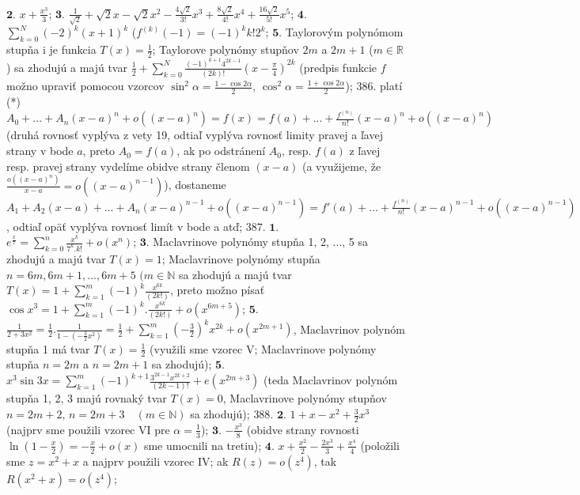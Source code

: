$\boldsymbol{2.}$ $x+\frac{x^{3}}{3}$;
$\boldsymbol{3.}$ $\frac{1}{\sqrt{2}}+\sqrt{2}x-\sqrt{2}x^{2}-\frac{4\sqrt{2}}{3!}x^{3}+\frac{8\sqrt{2}}{4!}x^{4}+\frac{16\sqrt{2}}{5!}x^{5}$;
$\boldsymbol{4.}$ $\sum_{k=0}^N (-2)^{k}(x+1)^{k}$ ($f^{(k)}(-1)=(-1)^{k}k!2^{k}$;
$\boldsymbol{5.}$ Taylorovým polynómom stupňa i je funkcia $T(x)=\frac{1}{2}$; Taylorove polynómy stupňov $2m$ a $2m+1$ ($m \in \mathbb{R}$) sa zhodujú a majú tvar $\frac{1}{2}+\sum_{k=0}^N \frac{(-1)^{k+1}4^{2k-1}}{(2k)!}(x-\frac{\pi}{4})^{2k}$ (predpis funkcie $f$ možno upraviť pomocou vzorcov $\sin ^{2}\alpha =\frac{1-\cos 2\alpha}{2}$, $\cos ^{2} \alpha =\frac{1+\cos 2\alpha}{2}$);
$\boxed{386.}$ platí (*) $A_{0}+...+A_{n}(x-a)^{n}+o((x-a)^{n})=f(x)=f(a)+...+\frac{f^{(n)}}{n!}(x-a)^{n}+o((x-a)^{n})$ (druhá rovnosť vyplýva z vety 19, odtiaľ vyplýva rovnosť limity pravej a ľavej strany v bode $a$, preto $A_{0}=f(a)$, ak po odstránení $A_{0}$, resp. $f(a)$ z ľavej resp. pravej strany vydelíme obidve strany členom $(x-a)$ (a využijeme, že $\frac{o((x-a)^{n})}{x-a}=o((x-a)^{n-1})$), dostaneme $A_{1}+A_{2}(x-a)+...+A_{n}(x-a)^{n-1}+o((x-a)^{n-1})=f'(a)+...+\frac{f^{(n)}}{n!}(x-a)^{n-1}+o((x-a)^{n-1})$, odtiaľ opäť vyplýva rovnosť limít v bode a atď;
$\boxed{387.}$ $\boldsymbol{1.}$  $e^{\frac{x}{7}}=\sum_{k=0}^n \frac{x^{k}}{7^{k}.k!}+o(x^{n})$;
$\boldsymbol{3.}$ Maclavrinove polynómy stupňa 1, 2, ..., 5 sa zhodujú a majú tvar $T(x)=1$; Maclavrinove polynómy stupňa $n=6m, 6m+1,...,6m+5$ $(m \in \mathbb{N}$ sa zhodujú a majú tvar $T(x)=1+ \sum_{k=1}^m (-1)^{k}\frac{x^{6k}}{(2k!)}$, preto možno písať $\cos x^{3}=1+\sum_{k=1}^m (-1)^{k}.\frac{x^{6k}}{(2k!)}+o(x^{6m+5})$;
$\boldsymbol{5.}$ $\frac{1}{2+3x^{2}}=\frac{1}{2}. \frac{1}{1-(-\frac{3}{2}x^{2})}=\frac{1}{2}+\sum_{k=1}^m (-\frac{3}{2})^{k}x^{2k}+o(x^{2m+1})$,  Maclavrinov polynóm stupňa 1 má tvar $T(x)=\frac{1}{2}$ (využili sme vzorec V;  Maclavrinove polynómy stupňa $n=2m$ a $n=2m+1$ sa zhodujú);
$\boldsymbol{5.}$ $x^{3}\sin 3x= \sum_{k=1}^m (-1)^{k+1}\frac{3^{2k-1}x^{2k+2}}{(2k-1)!}+e(x^{2m+3})$ (teda Maclavrinov polynóm stupňa 1, 2, 3 majú rovnaký  tvar $T(x)=0$,  Maclavrinove polynómy stupňov  $n=2m+2, \, n=2m+3\quad (m\in \mathbb{N})$ sa zhodujú);
$\boxed{388.}$ $\boldsymbol{2.}$ $1+x-x^{2}+\frac{3}{2}x^{3} $ (najprv sme použili vzorec VI pre $\alpha=\frac{1}{3} $);
$\boldsymbol{3.}$ $-\frac{x^{3}}{8}$ (obidve strany rovnosti $\ln (1-\frac{x}{2})=-\frac{x}{2}+o(x)$ sme umocnili na tretiu);
$\boldsymbol{4.}$	$x+\frac{x^{2}}{2} -\frac{2x^{3}}{3}+\frac{x^{4}}{4} $ (položili sme  $ z=x^{2}+x $  a najprv použili vzorec IV; ak  $R(z)=o(z^{4})$, tak  $R(x^{2}+x)= o(z^{4}) $;
